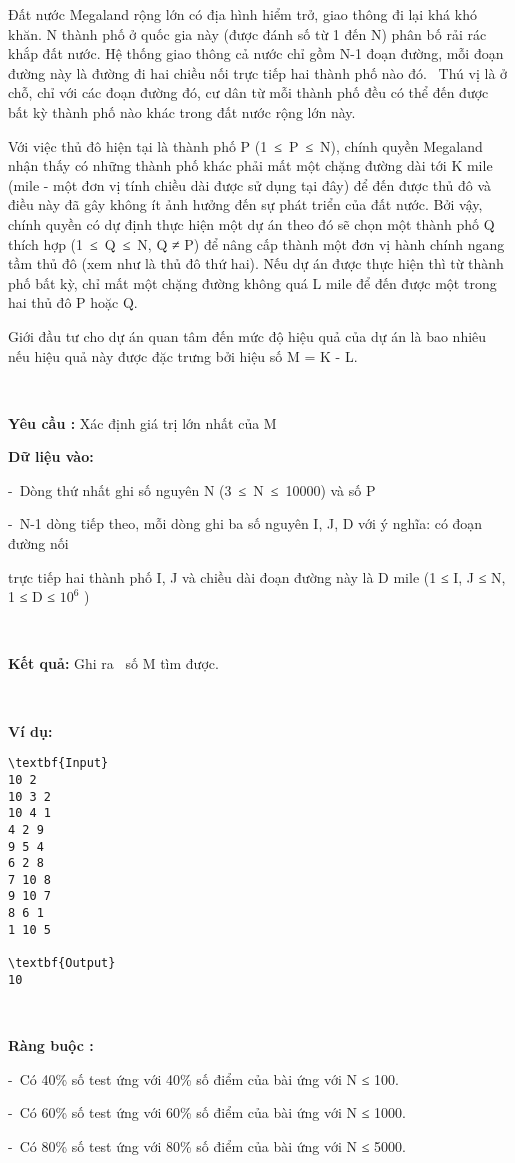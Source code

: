 

Đất nước Megaland rộng lớn có địa hình hiểm trở, giao thông đi lại khá khó khăn. N thành phố ở quốc gia này (được đánh số từ 1 đến N) phân bố rải rác khắp đất nước. Hệ thống giao thông cả nước chỉ gồm N-1 đoạn đường, mỗi đoạn đường này là đường đi hai chiều nối trực tiếp hai thành phố nào đó.  Thú vị là ở chỗ, chỉ với các đoạn đường đó, cư dân từ mỗi thành phố đều có thể đến được bất kỳ thành phố nào khác trong đất nước rộng lớn này.

Với việc thủ đô hiện tại là thành phố P (1 ≤ P ≤ N), chính quyền Megaland nhận thấy có những thành phố khác phải mất một chặng đường dài tới K mile (mile - một đơn vị tính chiều dài được sử dụng tại đây) để đến được thủ đô và điều này đã gây không ít ảnh hưởng đến sự phát triển của đất nước. Bởi vậy, chính quyền có dự định thực hiện một dự án theo đó sẽ chọn một thành phố Q thích hợp (1 ≤ Q ≤ N, Q ≠ P) để nâng cấp thành một đơn vị hành chính ngang tầm thủ đô (xem như là thủ đô thứ hai). Nếu dự án được thực hiện thì từ thành phố bất kỳ, chỉ mất một chặng đường không quá L mile để đến được một trong hai thủ đô P hoặc Q.

Giới đầu tư cho dự án quan tâm đến mức độ hiệu quả của dự án là bao nhiêu nếu hiệu quả này được đặc trưng bởi hiệu số M = K - L.

 

\textbf{Yêu cầu : } Xác định giá trị lớn nhất của M

\textbf{Dữ liệu vào: }

- Dòng thứ nhất ghi số nguyên N (3 ≤ N ≤ 10000) và số P

- N-1 dòng tiếp theo, mỗi dòng ghi ba số nguyên I, J, D với ý nghĩa: có đoạn đường nối

trực tiếp hai thành phố I, J và chiều dài đoạn đường này là D mile (1 ≤ I, J ≤ N, 1 ≤ D ≤ $10^{6}$ )

 

\textbf{Kết quả: } Ghi ra  số M tìm được.

 

\textbf{Ví dụ: }
\begin{verbatim}
\textbf{Input}
10 2
10 3 2
10 4 1
4 2 9
9 5 4
6 2 8
7 10 8
9 10 7
8 6 1
1 10 5

\textbf{Output}
10\end{verbatim}

 

\textbf{Ràng buộc : }

- Có 40\% số test ứng với 40\% số điểm của bài ứng với N ≤ 100.

- Có 60\% số test ứng với 60\% số điểm của bài ứng với N ≤ 1000.

- Có 80\% số test ứng với 80\% số điểm của bài ứng với N ≤ 5000.

 

